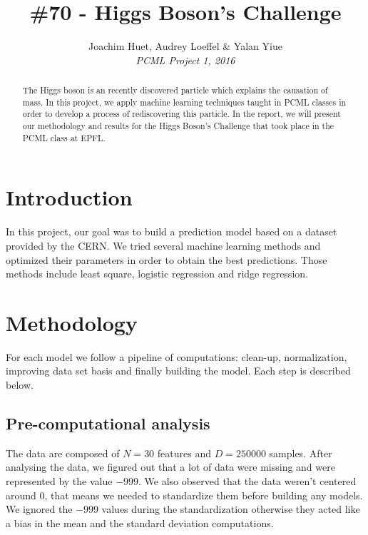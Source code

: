 \documentclass[10pt,conference,compsocconf]{IEEEtran}
\begin{document}
\title{\#70 - Higgs Boson's Challenge}

\author{
  Joachim Huet, Audrey Loeffel \& Yalan Yiue\\
  \textit{PCML Project 1, 2016}
}

\maketitle

\begin{abstract}
The Higgs boson is an recently discovered particle which explains the causation of mass. In this project, we apply machine learning techniques taught in PCML classes in order to develop a process of rediscovering this particle. In the report, we will present our methodology and results for the Higgs Boson's Challenge that took place in the PCML class at EPFL.
\end{abstract}

\section{Introduction}

In this project, our goal was to build a prediction model based on a dataset provided by the {CERN}. We tried several machine learning methods and optimized their parameters in order to obtain the best predictions. Those methods include least square, logistic regression and ridge regression. 

\section{Methodology}
\label{sec:structure-paper}

For each model we follow a pipeline of computations: clean-up, normalization, improving data set basis and finally building the model. Each step is described below.

\subsection{Pre-computational analysis}

The data are composed of $N = 30$ features and $D = 250000$ samples.
After analysing the data, we figured out that a lot of data were missing and were represented by the value $-999$. 
We also observed that the data weren't centered around 0, that means we needed to standardize them before building any models.
We ignored the $-999$ values during the standardization otherwise they acted like a bias in the mean and the standard deviation computations.
\end{document}
